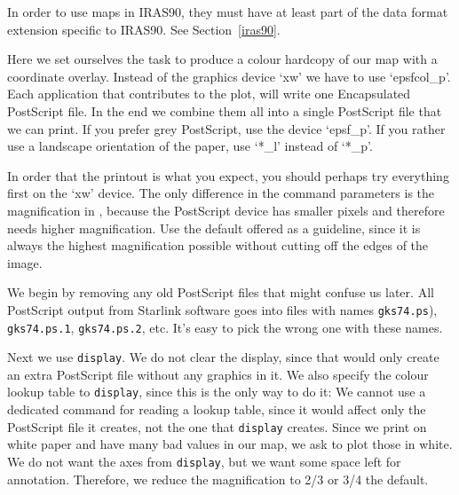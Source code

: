 \documentclass[11pt,noabs]{starlink}
\begin{document}
   In order to use maps in IRAS90, they must have at least part
   of the data format extension specific to IRAS90. See
Section~\ref{iras90}.

   Here we set ourselves the task to produce a colour hardcopy of our
   map with a coordinate overlay. Instead of the graphics device `xw' we
   have to use `epsfcol\_p'. Each application that contributes to the
   plot, will write one Encapsulated PostScript file. In the end we
   combine them all into a single PostScript file that we can print. If
   you prefer grey PostScript, use the device `epsf\_p'. If you rather
   use a landscape orientation of the paper, use `*\_l' instead of `*\_p'.

   In order that the printout is what you expect, you should perhaps try
   everything first on the `xw' device. The only difference in the
   command parameters is the magnification in
\texttt{},
   because
   the PostScript device has smaller pixels and therefore needs higher
   magnification. Use the default offered as a guideline, since it is
   always the highest magnification possible without cutting off the
   edges of the image.

   We begin by removing any old PostScript files that might confuse us
   later. All PostScript output from Starlink software goes into files
   with names \texttt{gks74.ps}), \texttt{gks74.ps.1}, \texttt{gks74.ps.2},
   etc. It's easy to pick the wrong one with these names.

\begin{terminalv}
\end{terminalv}

   Next we use \texttt{display}. We do not clear the display, since that
   would only create an extra PostScript file without any graphics in
   it. We also specify the colour lookup table to \texttt{display},
   since this is the only way to do it: We cannot use a dedicated
   command for reading a lookup table, since it would affect only the
   PostScript file it creates,
   not the one that \texttt{display} creates. Since we print on white
   paper and have many bad values in our map, we ask to plot those in
   white. We do not want the axes from \texttt{display}, but we want
   some space left for annotation. Therefore, we reduce the
   magnification to 2/3 or 3/4 the default.
\end{document}
